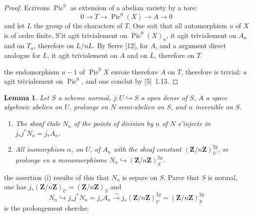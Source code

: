 \documentclass[12pt,a4paper]{article}
\theoremstyle{plain}
\newtheorem{lemma}[theorem]{Lemma}
\theoremstyle{definition}
\theoremstyle{remark}
\DeclareMathOperator{\Pic}{Pic}
\begin{document}
\begin{proof}
Ecrivons $\Pic^0$ as extension of a abelian variety by a tore:
\[
0 \to T \to \Pic^0(X) \to A \to 0
\]
and let $L$ the group of the characters of $T$. One sait that all automorphism $u$ of $X$ is of ordre finite. S'it agit trivialement on $\Pic^0(X)_n$, it agit trivialement on $A_n$ and on $T_n$, therefore on $L/nL$. By Serre [12], for $A$, and a argument direct analogue for $L$, it agit trivialement on $A$ and on $L$, therefore on $T$.

the endomorphism $u - 1$ of $\Pic^0 X$ envoie therefore $A$ on $T$, therefore is trivial: $u$ agit trivialement on $\Pic^0$, and one conclut by [5]~1.13.
\end{proof}

\begin{lemma}\label{lem:3.5.2}
Let $S$ a scheme normal, $j : U \hookrightarrow S$ a open dense of $S$, $A$ a space algebraic abelien on $U$, prolonge en $N$ semi-abelien on $S$, and $n$ inversible on $S$.

\begin{enumerate}[label=(\roman*)]
\item The sheaf étale $N_n$ of the points of division by $n$ of $N$ s'injecte in $j_* j^* N_n = j_* A_n$.
\item All isomorphism $\alpha$, on $U$, of $A_n$ with the sheaf constant $(\mathbf{Z}/n\mathbf{Z})^{2g}_U$, se prolonge en a monomorphisme $N_n \hookrightarrow (\mathbf{Z}/n\mathbf{Z})^{2g}_S$.
\end{enumerate}
\end{lemma}

the assertion (i) resulte of this that $N_n$ is separe on $S$. Parce that $S$ is normal, one has $j_* (\mathbf{Z}/n\mathbf{Z})_U = (\mathbf{Z}/n\mathbf{Z})_S$ and
\[
N_n \hookrightarrow j_* j^* N_n = j_* A_n \xrightarrow{\sim} j_* (\mathbf{Z}/n\mathbf{Z})^{2g}_U = (\mathbf{Z}/n\mathbf{Z})^{2g}_S
\]
is the prolongement cherche.
\end{document}
